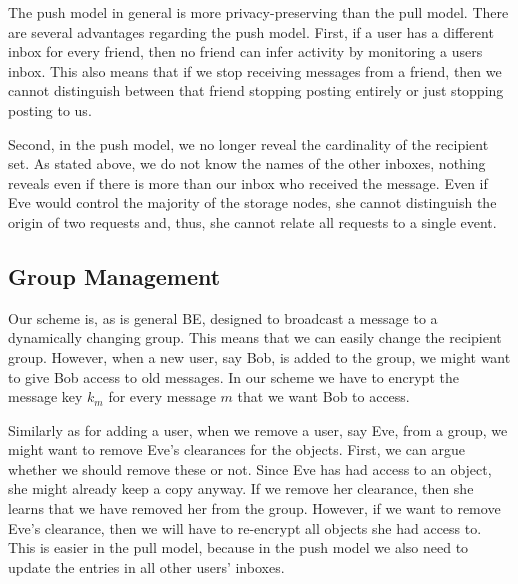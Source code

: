 The push model in general is more privacy-preserving than the pull model.
There are several advantages regarding the push model.
First, if a user has a different inbox for every friend, then no friend can 
infer activity by monitoring a users inbox.
This also means that if we stop receiving messages from a friend, then we 
cannot distinguish between that friend stopping posting entirely or just 
stopping posting to us.

Second, in the push model, we no longer reveal the cardinality of the recipient 
set.
As stated above, we do not know the names of the other inboxes, nothing reveals 
even if there is more than our inbox who received the message.
Even if Eve would control the majority of the storage nodes, she cannot 
distinguish the origin of two requests and, thus, she cannot relate all 
requests to a single event.

\subsection{Group Management}\label{sec:GroupManagement}

Our scheme is, as is general \ac{BE}, designed to broadcast a message to 
a dynamically changing group.
This means that we can easily change the recipient group.
However, when a new user, say Bob, is added to the group, we might want to give 
Bob access to old messages.
In our scheme we have to encrypt the message key \(k_m\) for every message 
\(m\) that we want Bob to access.

Similarly as for adding a user, when we remove a user, say Eve, from a group, 
we might want to remove Eve's clearances for the objects.
First, we can argue whether we should remove these or not.
Since Eve has had access to an object, she might already keep a copy anyway.
If we remove her clearance, then she learns that we have removed her from the 
group.
However, if we want to remove Eve's clearance, then we will have to re-encrypt 
all objects she had access to.
This is easier in the pull model, because in the push model we also need to 
update the entries in all other users' inboxes.





